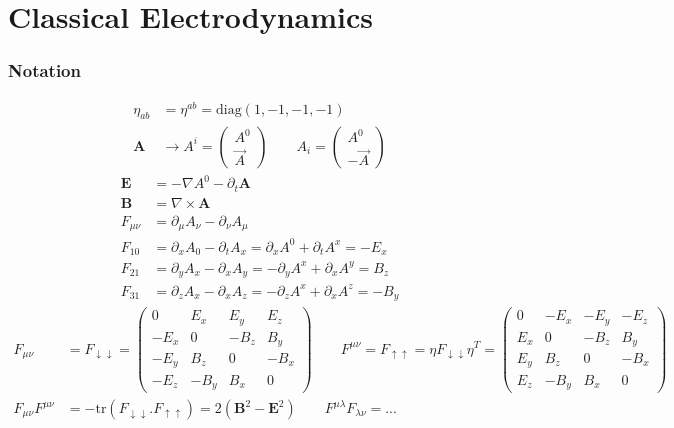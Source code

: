 \documentclass[../main.tex]{subfiles}
\begin{document}
\section{Classical Electrodynamics}
\subsubsection{Notation}
\begin{align}
\eta_{ab}&=\eta^{ab}=\text{diag}(1,-1,-1,-1)\\
\mathbf{A}&\rightarrow A^i=\begin{pmatrix}
A^0\\
\vec{A}
\end{pmatrix}\qquad A_i=\begin{pmatrix}
A^0\\
-\vec{A}
\end{pmatrix}
\end{align}
\begin{align}
\mathbf{E}&=-\nabla A^0-\partial_t\mathbf{A}\\
\mathbf{B}&=\nabla\times\mathbf{A}\\
F_{\mu\nu}&=\partial_\mu A_\nu-\partial_\nu A_\mu\\
F_{10}&=\partial_xA_0-\partial_tA_x=\partial_xA^0+\partial_tA^x=-E_x\\
F_{21}&=\partial_yA_x-\partial_xA_y=-\partial_yA^x+\partial_xA^y=B_z\\
F_{31}&=\partial_zA_x-\partial_xA_z=-\partial_zA^x+\partial_xA^z=-B_y
\end{align}
\begin{align}
F_{\mu\nu}&=F_{\downarrow\downarrow}=\begin{pmatrix}
0    &  E_x & E_y  & E_z\\
-E_x &  0   & -B_z & B_y\\
-E_y &  B_z & 0    & -B_x\\
-E_z & -B_y & B_x  & 0
\end{pmatrix}
\qquad
F^{\mu\nu}=F_{\uparrow\uparrow}=\eta F_{\downarrow\downarrow}\eta^T=\begin{pmatrix}
0    &  -E_x & -E_y  & -E_z\\
E_x &  0   & -B_z & B_y\\
E_y &  B_z & 0    & -B_x\\
E_z & -B_y & B_x  & 0
\end{pmatrix}\\
F_{\mu\nu}F^{\mu\nu}&=-\text{tr}(F_{\downarrow\downarrow}.F_{\uparrow\uparrow})=2(\mathbf{B}^2-\mathbf{E}^2)
\qquad
F^{\mu\lambda}F_{\lambda\nu}=...
\end{align}
\end{document}
